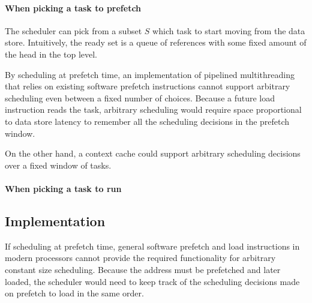 \paragraph{When picking a task to prefetch}
The scheduler can pick from a subset $S$ which task to start moving
from the data store. Intuitively, the ready set is a queue of
references with some fixed amount of the head in the top level.

By scheduling at prefetch time, an implementation of pipelined
multithreading that relies on existing software prefetch instructions
cannot support arbitrary scheduling even between a fixed number of
choices. Because a future load instruction reads the task, arbitrary
scheduling would require space proportional to data store latency to
remember all the scheduling decisions in the prefetch window.

On the other hand, a context cache could support arbitrary scheduling
decisions over a fixed window of tasks. 

\paragraph{When picking a task to run}


\subsection{Implementation}
If scheduling at prefetch time, general software prefetch and load instructions in modern processors
cannot provide the required functionality for arbitrary constant size
scheduling. Because the address must be prefetched and later loaded,
the scheduler would need to keep track of the scheduling decisions
made on prefetch to load in the same order. 
